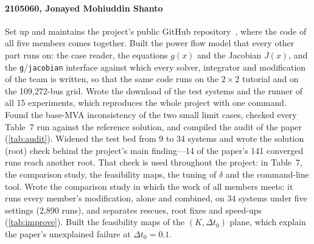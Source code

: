 \documentclass[sigconf,nonacm]{acmart}
\newcommand{\code}[1]{\texttt{#1}}
\begin{document}
\paragraph{2105060, Jonayed Mohiuddin Shanto}
Set up and maintains the project's public GitHub repository~\cite{ourrepo}, where the code of all five
members comes together. Built the power flow model that every other part runs on: the case reader, the
equations $g(x)$ and the Jacobian $J(x)$, and the \code{g}/\code{jacobian} interface against which every
solver, integrator and modification of the team is written, so that the same code runs on the $2\times2$
tutorial and on the 109{,}272-bus grid. Wrote the download of the test systems and the runner of all 15
experiments, which reproduces the whole project with one command. Found the base-MVA inconsistency of the
two small limit cases, checked every Table~7 run against the reference solution, and compiled the audit of
the paper (\cref{tab:audit}). Widened the test bed from 9 to 34 systems and wrote the solution (root) check
behind the project's main finding---14 of the paper's 141 converged runs reach another root. That check is
used throughout the project: in Table~7, the comparison study, the feasibility maps, the tuning of $\delta$
and the command-line tool. Wrote the comparison study in which the work of all members meets: it runs
every member's modification, alone and combined, on 34 systems under five settings (2{,}890 runs), and
separates rescues, root fixes and speed-ups (\cref{tab:improve}). Built the feasibility maps of the
$(K,\Delta t_0)$ plane, which explain the paper's unexplained failure at $\Delta t_0=0.1$.
\end{document}
